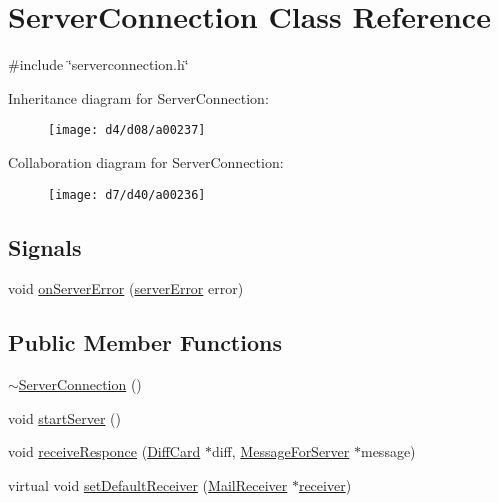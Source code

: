 \hypertarget{a00238}{}\section{Server\+Connection Class Reference}
\label{a00238}


{\ttfamily \#include \char`\"{}serverconnection.\+h\char`\"{}}



Inheritance diagram for Server\+Connection\+:\nopagebreak
\begin{figure}[H]
\begin{center}
\leavevmode
\texttt{[image: d4/d08/a00237]}
\end{center}
\end{figure}


Collaboration diagram for Server\+Connection\+:
\nopagebreak
\begin{figure}[H]
\begin{center}
\leavevmode
\texttt{[image: d7/d40/a00236]}
\end{center}
\end{figure}
\subsection*{Signals}
\begin{DoxyCompactItemize}
\item 
void \hyperlink{a00238_ae97f8eaa15a3da8f069ad502e89039ae}{on\+Server\+Error} (\hyperlink{a00131_a65727a063024ff0dedf1ac2f087f4165}{server\+Error} error)
\end{DoxyCompactItemize}
\subsection*{Public Member Functions}
\begin{DoxyCompactItemize}
\item 
\hyperlink{a00238_af919491d0e2ff066b0a58cc50fc0d90d}{$\sim$\+Server\+Connection} ()
\item 
void \hyperlink{a00238_a1d45a6a7b2370c82ed2849959bb18c2a}{start\+Server} ()
\item 
void \hyperlink{a00238_a26c5b969c3e5151033673e2bcce5ed4a}{receive\+Responce} (\hyperlink{a00190}{Diff\+Card} $\ast$diff, \hyperlink{a00166}{Message\+For\+Server} $\ast$message)
\item 
virtual void \hyperlink{a00162_aa85db0004c26606c5ac294e5de000b96}{set\+Default\+Receiver} (\hyperlink{a00154}{Mail\+Receiver} $\ast$\hyperlink{a00162_aa57ce2f74f8ad76abb38974f85b97ac5}{receiver})
\end{DoxyCompactItemize}
